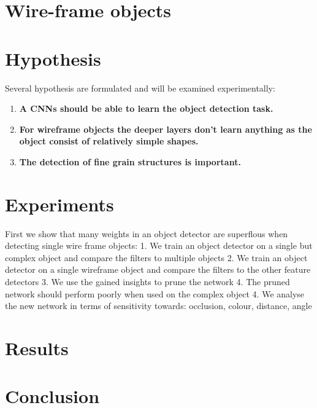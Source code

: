 \section{Wire-frame objects}






\section{Hypothesis}

Several hypothesis are formulated and will be examined experimentally:
\begin{enumerate}
	\item \textbf{A \acp{CNN} should be able to learn the object detection task.}
	\item \textbf{For wireframe objects the deeper layers don't learn anything as the object consist of relatively simple shapes.}
	\item \textbf{The detection of fine grain structures is important.}
\end{enumerate}
\newpage
\section{Experiments}

First we show that many weights in an object detector are superflous when detecting single wire frame objects:
1. We train an object detector on a single but complex object and compare the filters to multiple objects
2. We train an object detector on a single wireframe object and compare the filters to the other feature detectors
3. We use the gained insights to prune the network 
4. The pruned network should perform poorly when used on the complex object
4. We analyse the new network in terms of sensitivity towards: occlusion, colour, distance, angle

\section{Results}

\section{Conclusion}